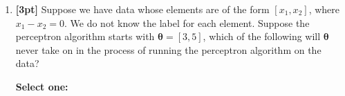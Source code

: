 \documentclass[12pt]{article}
\renewcommand{\circle}{\tikz\draw[black] (0,0) circle (1ex);}
\begin{document}
\begin{enumerate}
    \item \textbf{[3pt]} Suppose we have data whose elements are of the form $[x_1,x_2]$, where $x_1 - x_2 = 0$. We do not know the label for each element. Suppose the perceptron algorithm starts with $\bm{\theta} = [3,5]$, which of the following will $\bm{\theta}$ never take on in the process of running the perceptron algorithm on the data?

    \textbf{Select one:}
    \begin{list}{}
        \item $\circle$ $[-1,1]$
        \item $\circle$ $[4,6]$
        \item $\circle$ $[-3,-1]$
        \item $\circle$ $[5,5]$
    \end{list}


    
\end{enumerate}
\clearpage
\end{document}

